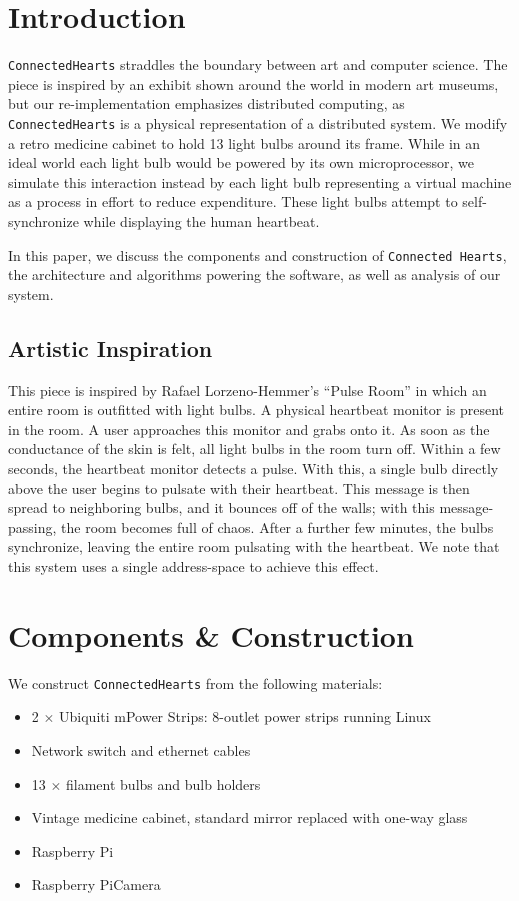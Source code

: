 \documentclass[preprint,review,12pt]{cs262}
\begin{document}
\section{Introduction}
\label{sec1}

\texttt{ConnectedHearts} straddles the boundary between art and computer science. The piece is inspired by an exhibit shown around the world in modern art museums, but our re-implementation emphasizes distributed computing, as \texttt{ConnectedHearts} is a physical representation of a distributed system. We modify a retro medicine cabinet to hold 13 light bulbs around its frame. While in an ideal world each light bulb would be powered by its own microprocessor, we simulate this interaction instead by each light bulb representing a virtual machine as a process in effort to reduce expenditure. These light bulbs attempt to self-synchronize while displaying the human heartbeat. 

In this paper, we discuss the components and construction of  \texttt{Connected Hearts}, the architecture and algorithms powering the software, as well as analysis of our system. 

\subsection{Artistic Inspiration}

This piece is inspired by Rafael Lorzeno-Hemmer's ``Pulse Room''\cite{pulse} in which an entire room is outfitted with light bulbs. A physical heartbeat monitor is present in the room. A user approaches this monitor and grabs onto it. As soon as the conductance of the skin is felt, all light bulbs in the room turn off. Within a few seconds, the heartbeat monitor detects a pulse. With this, a single bulb directly above the user begins to pulsate with their heartbeat. This message is then spread to neighboring bulbs, and it bounces off of the walls; with this message-passing, the room becomes full of chaos. After a further few minutes, the bulbs synchronize, leaving the entire room pulsating with the heartbeat. We note that this system uses a single address-space to achieve this effect. 


\section{Components \& Construction}

\noindent We construct \texttt{ConnectedHearts} from the following materials:
\begin{itemize} 
\item 2 $\times$ Ubiquiti mPower Strips: 8-outlet power strips running Linux
\item Network switch and ethernet cables
\item 13 $\times$ filament bulbs and bulb holders
\item Vintage medicine cabinet, standard mirror replaced with one-way glass
\item Raspberry Pi
\item Raspberry PiCamera
\end{itemize} 
\end{document}
